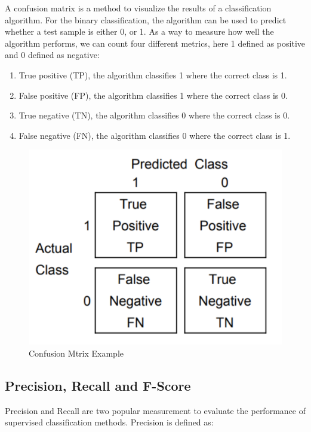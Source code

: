 A confusion matrix is a method to visualize the results of a classification algorithm. For the binary classification, the algorithm can be used to predict whether a test sample is either 0, or 1. As a way to measure how well the algorithm performs, we can count four different metrics, here 1 defined as positive and 0 defined as negative:

\begin{enumerate}

\item True positive (TP), the algorithm classifies 1 where the correct class is 1.
\item False positive (FP), the algorithm classifies 1 where the correct class is 0.
\item True negative (TN), the algorithm classifies 0 where the correct class is 0.
\item False negative (FN), the algorithm classifies 0 where the correct class is 1.

\end{enumerate}

\begin{figure}[hbtp]
\caption{Confusion Mtrix Example}
\includegraphics[scale=.5]{../Figures/Confuse_Mat_Example.png}\centering
\end{figure}

\subsection{Precision, Recall and F-Score}

Precision and Recall are two popular measurement to evaluate the performance of supervised classification methods. Precision is defined as:

